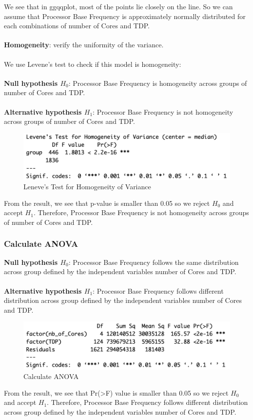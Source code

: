 We see that in ggqqplot, most of the points lie closely on the line. So we can assume that Processor Base Frequency is approximately normally distributed for each combinations of number of Cores and TDP.\\
\\
\textbf{Homogeneity}: verify the uniformity of the variance.\\
\\
We use Levene's test to check if this model is homogeneity:\\
\\
\textbf{Null hypothesis $H_0$}: Processor Base Frequency is homogeneity across groups of number of Cores and TDP.\\
\\
\textbf{Alternative hypothesis $H_1$}: Processor Base Frequency is not homogeneity across groups of number of Cores and TDP.
\begin{figure}[H]
    \centering
    \includegraphics[width=1\textwidth]{graphics/check_homogeneity.png}
    \caption{Leneve's Test for Homogeneity of Variance}
\end{figure}
From the result, we see that p-value is smaller than 0.05 so we reject $H_0$ and accept $H_1$. Therefore, Processor Base Frequency is not homogeneity across groups of number of Cores and TDP. 
\subsubsection{Calculate ANOVA}
\textbf{Null hypothesis $H_0$}: Processor Base Frequency follows the same distribution across group defined by the independent variables number of Cores and TDP.\\
\\
\textbf{Alternative hypothesis $H_1$}: Processor Base Frequency follows different distribution across group defined by the independent variables number of Cores and TDP.
\begin{figure}[H]
    \centering
    \includegraphics[width=1\textwidth]{graphics/calculate_anova.png}
    \caption{Calculate ANOVA}
\end{figure}
From the result, we see that Pr(>F) value is smaller than 0.05 so we reject $H_0$ and accept $H_1$. Therefore, Processor Base Frequency follows different distribution across group defined by the independent variables number of Cores and TDP.

